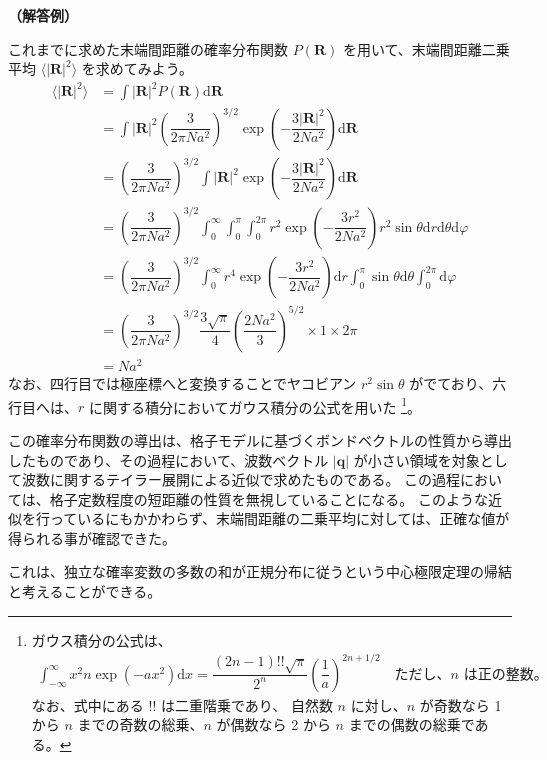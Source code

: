 \documentclass[uplatex,dvipdfmx,a4paper,11pt]{jsarticle}
\newcommand{\diff}{\mathrm d}
\begin{document}
\begin{enumerate}
{\bf （解答例）}

これまでに求めた末端間距離の確率分布関数 $P(\bm{R}) $ を用いて、末端間距離二乗平均 $\langle |\bm{R}|^2 \rangle$ を求めてみよう。
\begin{align*}
\langle |\bm{R}|^2 \rangle 
	&= \int |\bm{R}|^2 P(\bm{R}) \diff \bm{R} \\ 
	&= \int |\bm{R}|^2 \left( \dfrac{3}{2 \pi N a^2} \right)^{3/2} 
		\exp \left( -\dfrac{3|\bm{R}|^2}{2 N a^2} \right) \diff \bm{R} \\
	&= \left( \dfrac{3}{2 \pi N a^2} \right)^{3/2} \int |\bm{R}|^2  
		\exp \left( -\dfrac{3|\bm{R}|^2}{2 N a^2} \right) \diff \bm{R} \\
	&= \left( \dfrac{3}{2 \pi N a^2} \right)^{3/2} 
		\int_0^{\infty} \int_0^{\pi} \int_0^{2 \pi}
		r^2 \exp \left( -\dfrac{3 r^2}{2 N a^2} \right) r^2 \sin \theta \diff r \diff \theta \diff \varphi \\
	&= \left( \dfrac{3}{2 \pi N a^2} \right)^{3/2} 
		\int_0^{\infty}
		r^4 \exp \left( -\dfrac{3 r^2}{2 N a^2} \right) \diff r \int_0^{\pi} \sin \theta \diff \theta \int_0^{2 \pi} \diff \varphi \\
	&= \left( \dfrac{3}{2 \pi N a^2} \right)^{3/2} \dfrac{3 \sqrt{\pi}}{4} \left(\dfrac{2 N a^2}{3} \right)^{5/2} \times 1 \times 2\pi \\
	&= N a^2
\end{align*}
なお、四行目では極座標へと変換することでヤコビアン $r^2 \sin \theta$ がでており、六行目へは、$r$ に関する積分においてガウス積分の公式を用いた
\footnote
{
ガウス積分の公式は、
\begin{align*}
\int_{-\infty}^{\infty} x^2n \exp(-ax^2) \diff x = \dfrac{(2n-1)!! \sqrt{\pi}}{2^n} \left( \dfrac{1}{a} \right)^{{2n+1}/{2}}\quad \text{ただし、$n$ は正の整数。}
\end{align*}
なお、式中にある $!!$ は二重階乗であり、 自然数 $n$ に対し、$n$ が奇数なら 1 から $n$ までの奇数の総乗、$n$ が偶数なら 2 から $n$ までの偶数の総乗である。
}。

この確率分布関数の導出は、格子モデルに基づくボンドベクトルの性質から導出したものであり、その過程において、波数ベクトル $|\bm{q}|$ が小さい領域を対象として波数に関するテイラー展開による近似で求めたものである。
この過程においては、格子定数程度の短距離の性質を無視していることになる。
このような近似を行っているにもかかわらず、末端間距離の二乗平均に対しては、正確な値が得られる事が確認できた。

これは、独立な確率変数の多数の和が正規分布に従うという中心極限定理の帰結と考えることができる。

\end{enumerate}
\end{document}
